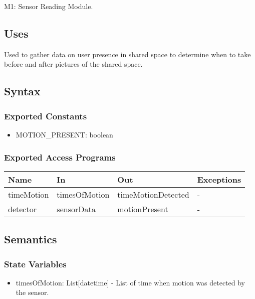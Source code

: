 \documentclass[12pt, titlepage]{article}
\begin{document}
M1: Sensor Reading Module.

\subsection{Uses}
Used to gather data on user presence in shared space to determine when to take before and after pictures of the shared space.


\subsection{Syntax}

\subsubsection{Exported Constants}
\begin{itemize}
  \item MOTION{\_}PRESENT: boolean
\end{itemize}

\subsubsection{Exported Access Programs}

\begin{center}
\begin{tabular}{p{4cm} p{4cm} p{4cm} p{3.5cm}}
\hline
\textbf{Name} & \textbf{In} & \textbf{Out} & \textbf{Exceptions} \\
\hline
timeMotion & timesOfMotion & timeMotionDetected & - \\
detector & sensorData & motionPresent & - \\
\hline
\end{tabular}
\end{center}

\subsection{Semantics}

\subsubsection{State Variables}

\begin{itemize}
  \item timesOfMotion: List[datetime] - List of time when motion was detected by the sensor.
\end{itemize}
\end{document}
